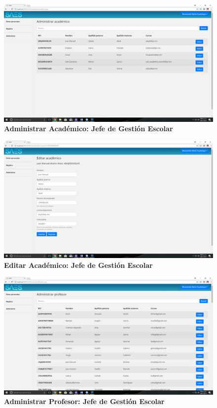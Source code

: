 \begin{figure}[H]
  \centering
    \includegraphics[scale=0.2]{project/images/21.png}
  \caption{\textbf{Administrar Académico: Jefe de Gestión Escolar}}
\end{figure}
\begin{figure}[H]
  \centering
    \includegraphics[scale=0.2]{project/images/22.png}
  \caption{\textbf{Editar Académico: Jefe de Gestión Escolar}}
\end{figure}
\begin{figure}[H]
  \centering
    \includegraphics[scale=0.2]{project/images/25.png}
  \caption{\textbf{Administrar Profesor: Jefe de Gestión Escolar}}
\end{figure}
